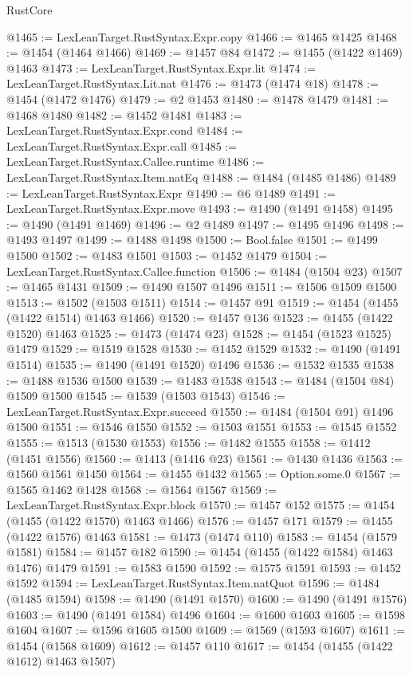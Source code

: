 \begin{lexlean}{RustCore}
\begin{coremodule}
@1465 := LexLeanTarget.RustSyntax.Expr.copy
@1466 := @1465 @1425
@1468 := @1454 (@1464 @1466)
@1469 := @1457 @84
@1472 := @1455 (@1422 @1469) @1463
@1473 := LexLeanTarget.RustSyntax.Expr.lit
@1474 := LexLeanTarget.RustSyntax.Lit.nat
@1476 := @1473 (@1474 @18)
@1478 := @1454 (@1472 @1476)
@1479 := @2 @1453
@1480 := @1478 @1479
@1481 := @1468 @1480
@1482 := @1452 @1481
@1483 := LexLeanTarget.RustSyntax.Expr.cond
@1484 := LexLeanTarget.RustSyntax.Expr.call
@1485 := LexLeanTarget.RustSyntax.Callee.runtime
@1486 := LexLeanTarget.RustSyntax.Item.natEq
@1488 := @1484 (@1485 @1486)
@1489 := LexLeanTarget.RustSyntax.Expr
@1490 := @6 @1489
@1491 := LexLeanTarget.RustSyntax.Expr.move
@1493 := @1490 (@1491 @1458)
@1495 := @1490 (@1491 @1469)
@1496 := @2 @1489
@1497 := @1495 @1496
@1498 := @1493 @1497
@1499 := @1488 @1498
@1500 := Bool.false
@1501 := @1499 @1500
@1502 := @1483 @1501
@1503 := @1452 @1479
@1504 := LexLeanTarget.RustSyntax.Callee.function
@1506 := @1484 (@1504 @23)
@1507 := @1465 @1431
@1509 := @1490 @1507 @1496
@1511 := @1506 @1509 @1500
@1513 := @1502 (@1503 @1511)
@1514 := @1457 @91
@1519 := @1454 (@1455 (@1422 @1514) @1463 @1466)
@1520 := @1457 @136
@1523 := @1455 (@1422 @1520) @1463
@1525 := @1473 (@1474 @23)
@1528 := @1454 (@1523 @1525) @1479
@1529 := @1519 @1528
@1530 := @1452 @1529
@1532 := @1490 (@1491 @1514)
@1535 := @1490 (@1491 @1520) @1496
@1536 := @1532 @1535
@1538 := @1488 @1536 @1500
@1539 := @1483 @1538
@1543 := @1484 (@1504 @84) @1509 @1500
@1545 := @1539 (@1503 @1543)
@1546 := LexLeanTarget.RustSyntax.Expr.succeed
@1550 := @1484 (@1504 @91) @1496 @1500
@1551 := @1546 @1550
@1552 := @1503 @1551
@1553 := @1545 @1552
@1555 := @1513 (@1530 @1553)
@1556 := @1482 @1555
@1558 := @1412 (@1451 @1556)
@1560 := @1413 (@1416 @23)
@1561 := @1430 @1436
@1563 := @1560 @1561 @1450
@1564 := @1455 @1432
@1565 := Option.some.{0}
@1567 := @1565 @1462 @1428
@1568 := @1564 @1567
@1569 := LexLeanTarget.RustSyntax.Expr.block
@1570 := @1457 @152
@1575 := @1454 (@1455 (@1422 @1570) @1463 @1466)
@1576 := @1457 @171
@1579 := @1455 (@1422 @1576) @1463
@1581 := @1473 (@1474 @110)
@1583 := @1454 (@1579 @1581)
@1584 := @1457 @182
@1590 := @1454 (@1455 (@1422 @1584) @1463 @1476) @1479
@1591 := @1583 @1590
@1592 := @1575 @1591
@1593 := @1452 @1592
@1594 := LexLeanTarget.RustSyntax.Item.natQuot
@1596 := @1484 (@1485 @1594)
@1598 := @1490 (@1491 @1570)
@1600 := @1490 (@1491 @1576)
@1603 := @1490 (@1491 @1584) @1496
@1604 := @1600 @1603
@1605 := @1598 @1604
@1607 := @1596 @1605 @1500
@1609 := @1569 (@1593 @1607)
@1611 := @1454 (@1568 @1609)
@1612 := @1457 @110
@1617 := @1454 (@1455 (@1422 @1612) @1463 @1507)

\end{coremodule}
\end{lexlean}
